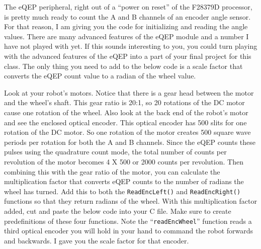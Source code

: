 \documentclass[11pt]{article}
\begin{document}
The eQEP peripheral, right out of a “power on reset” of the F28379D processor, is pretty much ready to count the A and B channels of an encoder angle sensor. For that reason, I am giving you the code for initializing and reading the angle values. There are many advanced features of the eQEP module and a number I have not played with yet. If this sounds interesting to you, you could turn playing with the advanced features of the eQEP into a part of your final project for this class. The only thing you need to add to the below code is a scale factor that converts the eQEP count value to a radian of the wheel value.

Look at your robot’s motors. Notice that there is a gear head between the motor and the wheel’s shaft. This gear ratio is 20:1, so 20 rotations of the DC motor cause one rotation of the wheel. Also look at the back end of the robot’s motor and see the enclosed optical encoder. This optical encoder has 500 slits for one rotation of the DC motor. So one rotation of the motor creates 500 square wave periods per rotation for both the A and B channels. Since the eQEP counts these pulses using the quadrature count mode, the total number of counts per revolution of the motor becomes 4 X 500 or 2000 counts per revolution. Then combining this with the gear ratio of the motor, you can calculate the multiplication factor that converts eQEP counts to the number of radians the wheel has turned. Add this to both the \texttt{ReadEncLeft()} and \texttt{ReadEncRight()} functions so that they return radians of the wheel. With this multiplication factor added, cut and paste the below code into your C file. Make sure to create predefinitions of these four functions. Note the “\texttt{readEncWheel}” function reads a third optical encoder you will hold in your hand to command the robot forwards and backwards. I gave you the scale factor for that encoder.
%
\end{document}
